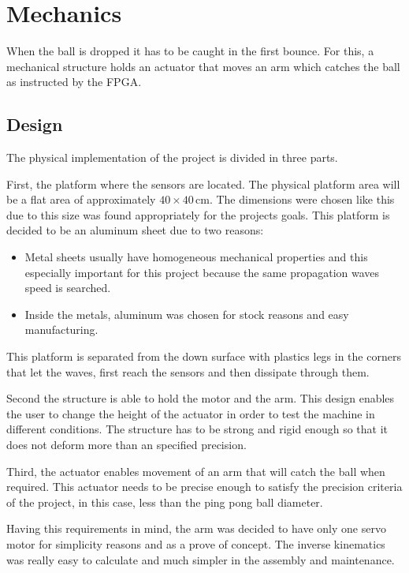 \chapter{Mechanics} %
\label{chap:mechanics}
	When the ball is dropped it has to be caught in the first bounce. 
	For this, a mechanical structure holds an actuator that moves an arm which catches the ball as instructed by the FPGA.

	\section{Design} %
	\label{sec:mechanics_design}
		The physical implementation of the project is divided in three parts.

		First, the platform where the sensors are located. 
		The physical platform area will be a flat area of approximately $40\times40\,\si{\centi\meter}$.
		The dimensions were chosen like this due to this size was found appropriately for the projects goals.
		This platform is decided to be an aluminum sheet due to two reasons: 
		\begin{itemize}
			\item Metal sheets usually have homogeneous mechanical properties and this especially important for this project because the same propagation waves speed is searched.
			\item Inside the metals, aluminum was chosen for stock reasons and easy manufacturing. 
		\end{itemize}
		This platform is separated from the down surface with plastics legs in the corners that let the waves, first reach the sensors and then dissipate through them.

		Second the structure is able to hold the motor and the arm. This design enables the user to change the height of the actuator in order to test the machine in different conditions. 
		The structure has to be strong and rigid enough so that it does not deform more than an specified precision.

		Third, the actuator enables movement of an arm that will catch the ball when required. 
		This actuator needs to be precise enough to satisfy the precision criteria of the project, in this case, less than the ping pong ball diameter. 
			
		Having this requirements in mind, the arm was decided to have only one servo motor for simplicity reasons and as a prove of concept. 
		The inverse kinematics was really easy to calculate and much simpler in the assembly and maintenance.
	
